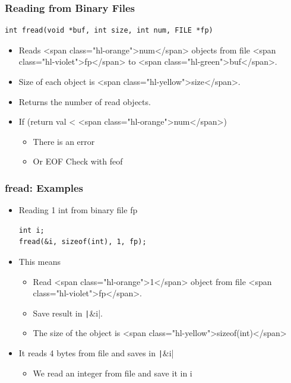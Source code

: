 \documentclass{../c-lecture}
\begin{document}
\begin{frame}[fragile]
  \frametitle{Reading from Binary Files}
  \begin{verbatim}
int fread(void *buf, int size, int num, FILE *fp)
  \end{verbatim}
  \begin{itemize}
    \item
      Reads <span class="hl-orange">num</span> objects from file
      <span class="hl-violet">fp</span> to <span class="hl-green">buf</span>.

    \item Size of each object is <span class="hl-yellow">size</span>.
    \item Returns the number of read objects.
    \item If (return val < <span class="hl-orange">num</span>)
    \begin{itemize}
      \item There is an error
      \item Or EOF \textrightarrow Check with feof
    \end{itemize}
  \end{itemize}
\end{frame}

\begin{frame}[fragile]
  \frametitle{fread: Examples}
  \begin{itemize}
    \item Reading 1 int from binary file fp
    \begin{verbatim}
int i;
fread(&i, sizeof(int), 1, fp);
    \end{verbatim}
    \item This means
    \begin{itemize}
      \item
        Read <span class="hl-orange">1</span> object from file
        <span class="hl-violet">fp</span>.

      \item Save result in \texttt|&i|.
      \item
        The size of the object is <span class="hl-yellow">sizeof(int)</span>

    \end{itemize}
    \item It reads 4 bytes from file and saves in \texttt|&i|
    \begin{itemize}
      \item We read an integer from file and save it in i
    \end{itemize}
  \end{itemize}
\end{frame}
\end{document}
